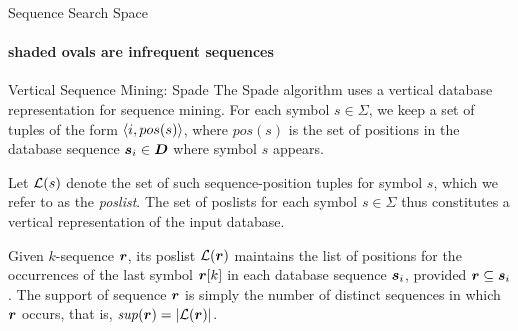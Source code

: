\begin{frame}{Sequence Search Space}
  \framesubtitle{shaded ovals are infrequent sequences}
\begin{center}
  \centerline{
  }
\end{center}
\end{frame}



\begin{frame}{Vertical Sequence Mining: Spade}
The Spade algorithm uses a vertical database representation for sequence
mining. For each symbol $s \in \Sigma$, we keep a
set of tuples of the form $\langle i, pos(s) \rangle$, where
$pos(s)$ is the set of positions in the database sequence
${\boldsymbol s}_i \in {\boldsymbol D}$ where symbol $s$
appears. 

\medskip
Let ${\mathcal L}(s)$ denote the set of such sequence-position tuples
for symbol $s$,
which we refer to as the {\em poslist}.
The set of poslists for each symbol $s \in \Sigma$ thus constitutes a
vertical representation of the input database.

\medskip
Given $k$-sequence
${\boldsymbol r}$, its poslist ${\mathcal L}({\boldsymbol r})$
maintains the list of positions for the occurrences
of the last symbol ${\boldsymbol r}[k]$ in each database sequence ${\boldsymbol s}_i$, provided
${\boldsymbol r} \subseteq {\boldsymbol s}_i$. The support of sequence ${\boldsymbol r}$ is simply the
number of distinct sequences in which ${\boldsymbol r}$ occurs, that is,
$\mathit{sup}({\boldsymbol r}) =
|{\mathcal L}({\boldsymbol r})|$.

\end{frame}

